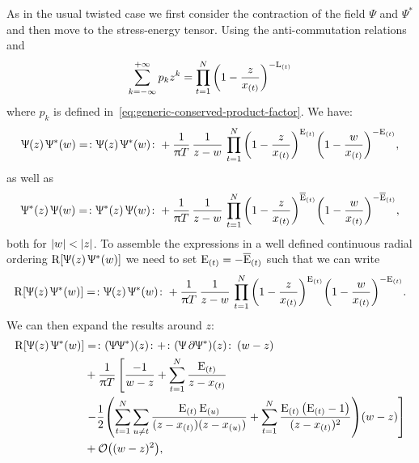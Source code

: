 As in the usual twisted case we first consider the contraction of the field $\Psi$ and $\Psi^*$ and then move to the stress-energy tensor.
Using the anti-commutation relations and
\begin{equation}
  \sum\limits_{k = -\infty}^{+\infty} p_k z^k = \prod\limits_{t = 1}^{N} \qty( 1 - \frac{z}{x_{(t)}} )^{-\mathrm{L}_{(t)}}
\end{equation}
where $p_k$ is defined in~\eqref{eq:generic-conserved-product-factor}.
We have:
\begin{equation}
  \Uppsi( z )\, \Uppsi^*( w )
  =
  \colon  \Uppsi( z )\, \Uppsi^*( w )  \colon
  +
  \frac{1}{\uppi T}\,
  \frac{1}{z - w}\,
  \prod\limits_{t = 1}^{N}
  \qty( 1 - \frac{z}{x_{(t)}} )^{\mathrm{E}_{(t)}}
  \qty( 1 - \frac{w}{x_{(t)}} )^{-\mathrm{E}_{(t)}},
\end{equation}
as well as
\begin{equation}
  \Uppsi^*( z )\, \Uppsi( w )
  =
  \colon  \Uppsi^*( z )\, \Uppsi( w )  \colon
  +
  \frac{1}{\uppi T}\,
  \frac{1}{z - w}\,
  \prod\limits_{t = 1}^{N}
  \qty( 1 - \frac{z}{x_{(t)}} )^{\overline{\mathrm{E}}_{(t)}}
  \qty( 1 - \frac{w}{x_{(t)}} )^{-\overline{\mathrm{E}}_{(t)}},
\end{equation}
both for $\abs{w} < \abs{z}$.
To assemble the expressions in a well defined continuous radial ordering $\mathrm{R}\qty[ \Uppsi( z )\, \Uppsi^*( w ) ]$ we need to set $\mathrm{E}_{(t)} = -\overline{\mathrm{E}}_{(t)}$ such that we can write
\begin{equation}
  \mathrm{R}\qty[ \Uppsi( z )\, \Uppsi^*( w ) ]
  =
  \colon  \Uppsi( z )\, \Uppsi^*( w )  \colon
  +
  \frac{1}{\uppi T}\,
  \frac{1}{z - w}\,
  \prod\limits_{t = 1}^{N}
  \qty( 1 - \frac{z}{x_{(t)}})^{\mathrm{E}_{(t)}}
  \qty( 1 - \frac{w}{x_{(t)}} )^{-\mathrm{E}_{(t)}}.
  \label{eq:gen_Radial_order}
\end{equation}
We can then expand the results around $z$:
\begin{equation}
  \begin{split}
    \rR\qty[\Psi( z )\, \Psi^*( w )]
    & =
    \no{ \qty(\Psi \Psi^*)( z ) }
    +
    \no{ \qty(\Psi\, \pd \Psi^*)( z ) }\, (w-z)
    \\
    & +
    \frac{1}{\pi T}
    \left[%
      \frac{-1}{w- z}
      +
      \finitesum{t}{1}{N} \frac{\rE_{(t)}}{z - x_{(t)}}
    \right.
    \\
    & \left.
      -
      \frac{1}{2}
      \qty(%
        \finitesum{t}{1}{N}
        \sum\limits_{u \neq t}
        \frac{\rE_{(t)}\, \rE_{(u)}}{( z - x_{(t)}) ( z - x_{(u)} )}
        +
        \finitesum{t}{1}{N}
        \frac{\rE_{(t)}\, \qty( \rE_{(t)} - 1 )}{( z - x_{(t)} )^2}
      )
      \qty( w - z )
    \right]
    \\
    & +
    \order{( w - z )^2},
  \end{split}
\end{equation}
